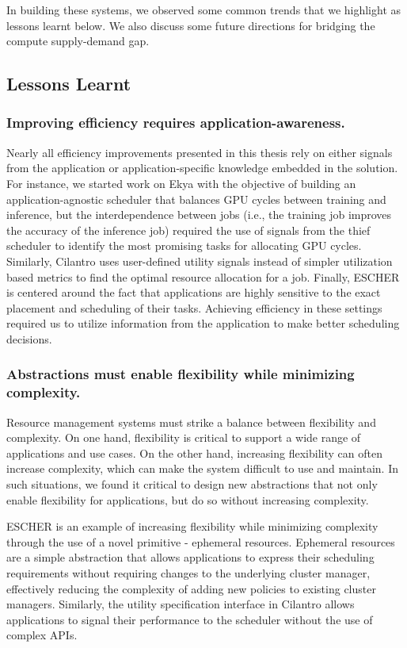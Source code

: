 In building these systems, we observed some common trends that we highlight as lessons learnt below. We also discuss some future directions for bridging the compute supply-demand gap.

\subsection{Lessons Learnt}

\subsubsection{Improving efficiency requires application-awareness.}
Nearly all efficiency improvements presented in this thesis rely on either signals from the application or application-specific knowledge embedded in the solution. For instance, we started work on Ekya with the objective of building an application-agnostic scheduler that balances GPU cycles between training and inference, but the interdependence between jobs (i.e., the training job improves the accuracy of the inference job) required the use of signals from the thief scheduler to identify the most promising tasks for allocating GPU cycles. Similarly, Cilantro uses user-defined utility signals instead of simpler utilization based metrics to find the optimal resource allocation for a job. Finally, ESCHER is centered around the fact that applications are highly sensitive to the exact placement and scheduling of their tasks. Achieving efficiency in these settings required us to utilize information from the application to make better scheduling decisions.

\subsubsection{Abstractions must enable flexibility while minimizing complexity.}
Resource management systems must strike a balance between flexibility and complexity. On one hand, flexibility is critical to support a wide range of applications and use cases. On the other hand, increasing flexibility can often increase complexity, which can make the system difficult to use and maintain. In such situations, we found it critical to design new abstractions that not only enable flexibility for applications, but do so  without increasing complexity. 

ESCHER is an example of increasing flexibility while minimizing complexity through the use of a novel primitive - ephemeral resources. Ephemeral resources are a simple abstraction that allows applications to express their scheduling requirements without requiring changes to the underlying cluster manager, effectively reducing the complexity of adding new policies to existing cluster managers. Similarly, the utility specification interface in Cilantro allows applications to signal their performance to the scheduler without the use of complex APIs. 


